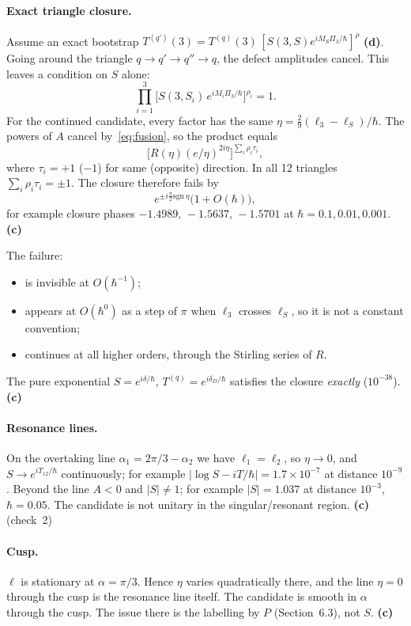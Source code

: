 \documentclass[11pt,a4paper]{article}
\newcommand{\Lc}{\textsf{\textbf{(c)}}}\newcommand{\Ld}{\textsf{\textbf{(d)}}}
\begin{document}
\paragraph{Exact triangle closure.} Assume an exact bootstrap $T^{(q')}(3)=T^{(q)}(3)\,[S(3,S)e^{iM_S\Pi_3/\hbar}]^{\rho}$ \Ld. Going around the triangle $q\to q'\to q''\to q$, the defect amplitudes cancel. This leaves a condition on $S$ alone:
\[
\prod_{i=1}^3\big[S(3,S_i)\,e^{iM_i\Pi_3/\hbar}\big]^{\rho_i}=1 .
\]
For the continued candidate, every factor has the same $\eta=\tfrac29(\ell_3-\ell_S)/\hbar$. The powers of $A$ cancel by~\eqref{eq:fusion}, so the product equals
\[
\big[R(\eta)(e/\eta)^{2i\eta}\big]^{\sum_i\rho_i\tau_i},
\]
where $\tau_i=+1$ ($-1$) for same (opposite) direction. In all 12 triangles $\sum_i\rho_i\tau_i=\pm1$. The closure therefore fails by
\[
e^{\pm i\frac\pi2\mathrm{sgn}\,\eta}\big(1+O(\hbar)\big),
\]
for example closure phases $-1.4989,\,-1.5637,\,-1.5701$ at $\hbar=0.1,0.01,0.001$. \Lc

The failure:
\begin{itemize}
\item is invisible at $O(\hbar^{-1})$;
\item appears at $O(\hbar^0)$ as a step of $\pi$ when $\ell_3$ crosses $\ell_S$, so it is not a constant convention;
\item continues at all higher orders, through the Stirling series of $R$.
\end{itemize}
The pure exponential $S=e^{i\delta/\hbar}$, $T^{(q)}=e^{i\delta_D/\hbar}$ satisfies the closure \emph{exactly} ($10^{-38}$). \Lc

\paragraph{Resonance lines.} On the overtaking line $\alpha_1=2\pi/3-\alpha_2$ we have $\ell_1=\ell_2$, so $\eta\to0$, and $S\to e^{iT_{12}/\hbar}$ continuously; for example $|\log S-iT/\hbar|=1.7\times10^{-7}$ at distance $10^{-9}$. Beyond the line $A<0$ and $|S|\neq1$; for example $|S|=1.037$ at distance $10^{-3}$, $\hbar=0.05$. The candidate is not unitary in the singular/resonant region. \Lc (check~2)

\paragraph{Cusp.} $\ell$ is stationary at $\alpha=\pi/3$. Hence $\eta$ varies quadratically there, and the line $\eta=0$ through the cusp is the resonance line itself. The candidate is smooth in $\alpha$ through the cusp. The issue there is the labelling by $P$ (Section~6.3), not $S$. \Lc
\end{document}
